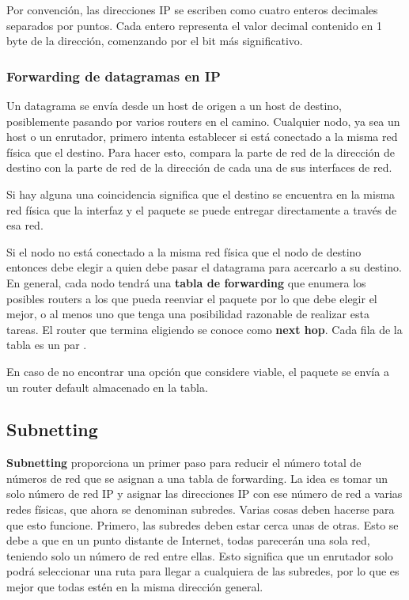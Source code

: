 Por convención, las direcciones IP se escriben como cuatro enteros decimales separados por puntos. Cada entero representa el valor decimal contenido en 1 byte de la dirección, comenzando por el bit más significativo.

\subsubsection{Forwarding de datagramas en IP}
Un datagrama se envía desde un host de origen a un host de destino, posiblemente pasando por varios routers en el camino. Cualquier nodo, ya sea un host o un enrutador, primero intenta establecer si está conectado a la misma red física que el destino. Para hacer esto, compara la parte de red de la dirección de destino con la parte de red de la dirección de cada una de sus interfaces de red.

Si hay alguna una coincidencia significa que el destino se encuentra en la misma red física que la interfaz y el paquete se puede entregar directamente a través de esa red.

Si el nodo no está conectado a la misma red física que el nodo de destino entonces debe elegir a quien debe pasar el datagrama para acercarlo a su destino. En general, cada nodo tendrá una \textbf{tabla de forwarding} que enumera los posibles routers a los que pueda reenviar el paquete por lo que debe elegir el mejor, o al menos uno que tenga una posibilidad razonable de realizar esta tareas. El router que termina eligiendo se conoce como \textbf{next hop}. Cada fila de la tabla es un par \(<NetworkNum, NextHop>\).

En caso de no encontrar una opción que considere viable, el paquete se envía a un router default almacenado en la tabla.

\subsection{Subnetting}
\textbf{Subnetting} proporciona un primer paso para reducir el número total de números de red que se asignan a una tabla de forwarding. La idea es tomar un solo número de red IP y asignar las direcciones IP con ese número de red a varias redes físicas, que ahora se denominan subredes. Varias cosas deben hacerse para que esto funcione. Primero, las subredes deben estar cerca unas de otras. Esto se debe a que en un punto distante de Internet, todas parecerán una sola red, teniendo solo un número de red entre ellas. Esto significa que un enrutador solo podrá seleccionar una ruta para llegar a cualquiera de las subredes, por lo que es mejor que todas estén en la misma dirección general.

